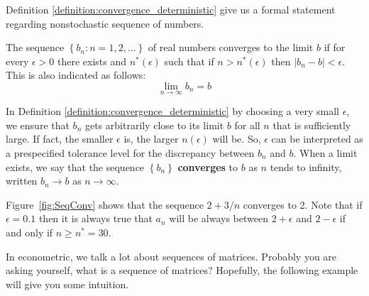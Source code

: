 Definition \ref{definition:convergence_deterministic} give us a formal statement regarding nonstochastic sequence of numbers.

\begin{definition}\label{definition:convergence_deterministic}
	The sequence $\left\lbrace b_n: n = 1,2,... \right\rbrace$ of real numbers  converges to the limit $b$ if for every $\epsilon > 0$ there exists and $n^*(\epsilon)$ such that if $n>n^*(\epsilon)$ then $|b_n - b|<\epsilon$. This is also indicated as follows:
\begin{equation*}
\lim_{n\to \infty} b_n = b
\end{equation*}	
\end{definition}

In Definition \ref{definition:convergence_deterministic} by choosing a very small $\epsilon$, we ensure that $b_n$ gets arbitrarily close to its limit $b$ for all $n$ that is sufficiently large. If fact, the smaller $\epsilon$ is, the larger $n(\epsilon)$ will be. So, $\epsilon$ can be interpreted as a prespecified tolerance level for the discrepancy between $b_n$ and $b$. When a limit exists, we say that the sequence $\left\lbrace b_n \right\rbrace$ \textbf{converges} to $b$ as $n$ tends to infinity, written $b_n\to b$ as $n\to \infty$.

Figure~\ref{fig:SeqConv} shows that the sequence $2 + 3/n$ converges to 2. Note that if $\epsilon = 0.1$ then it is always true that $a_n$ will be always between $2 + \epsilon$ and $2 - \epsilon$ if and only if $n \geq n^*= 30$.

In econometric, we talk a lot about sequences of matrices. Probably you are asking yourself, what is a sequence of matrices? Hopefully, the following example will give you some intuition. 

